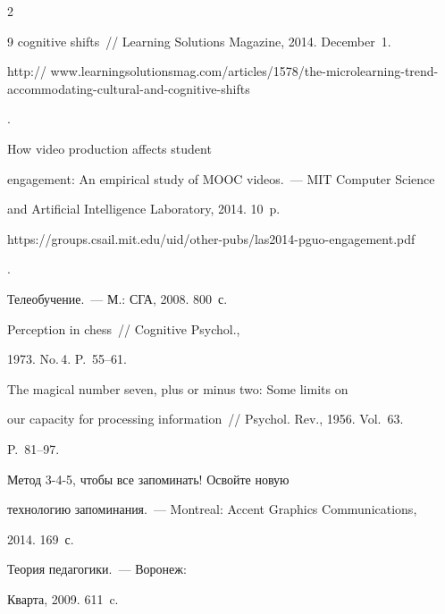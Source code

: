 \begin{multicols}{2}
{{\begin{thebibliography}{9}
cognitive shifts~// Learning Solutions Magazine, 2014. December~1. {\sf 


http:// www.learningsolutionsmag.com/articles/1578/the-microlearning-trend-accommodating-cultural-and-cognitive-shifts}.




 How video production affects student 


engagement: An empirical study of MOOC videos.~--- MIT Computer Science 


and Artificial Intelligence Laboratory, 2014. 10~p. {\sf 


https://groups.csail.mit.edu/uid/other-pubs/las2014-pguo-engagement.pdf}.




 Телеобучение.~--- М.: СГА, 2008. 800~с.




 Perception in chess~// Cognitive Psychol., 


1973. No.\,4. P.~55--61.




 The magical number seven, plus or minus two: Some limits on 


our capacity for processing information~// Psychol. Rev., 1956. Vol.~63. 


P.~81--97.




 Метод 3-4-5, чтобы все запоминать! Освойте новую 


технологию запоминания.~--- Montreal: Accent Graphics Communications, 


2014. 169~с.




 Теория педагогики.~--- Воронеж: 


Кварта, 2009. 611~c.


\end{thebibliography}





 }


 }





\end{multicols}





